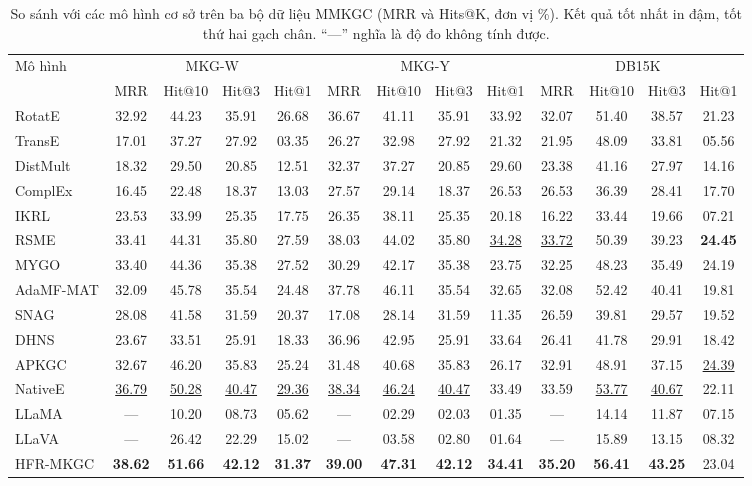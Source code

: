 \documentclass[10pt,twocolumn,a4paper]{article}
\begin{document}
\begin{table}[t]
\centering
\small
\setlength{\tabcolsep}{4.5pt}
\begin{tabular}{l cccc cccc cccc}
\toprule
\multirow{2}{*}{Mô hình} & \multicolumn{4}{c}{MKG-W} & \multicolumn{4}{c}{MKG-Y} & \multicolumn{4}{c}{DB15K}\\
\cmidrule(lr){2-5}\cmidrule(lr){6-9}\cmidrule(lr){10-13}
 & MRR & Hit@10 & Hit@3 & Hit@1 & MRR & Hit@10 & Hit@3 & Hit@1 & MRR & Hit@10 & Hit@3 & Hit@1\\
\midrule
RotatE & 32.92 & 44.23 & 35.91 & 26.68 & 36.67 & 41.11 & 35.91 & 33.92 & 32.07 & 51.40 & 38.57 & 21.23 \\
TransE & 17.01 & 37.27 & 27.92 & 03.35 & 26.27 & 32.98 & 27.92 & 21.32 & 21.95 & 48.09 & 33.81 & 05.56 \\
DistMult & 18.32 & 29.50 & 20.85 & 12.51 & 32.37 & 37.27 & 20.85 & 29.60 & 23.38 & 41.16 & 27.97 & 14.16 \\
ComplEx & 16.45 & 22.48 & 18.37 & 13.03 & 27.57 & 29.14 & 18.37 & 26.53 & 26.53 & 36.39 & 28.41 & 17.70 \\
IKRL & 23.53 & 33.99 & 25.35 & 17.75 & 26.35 & 38.11 & 25.35 & 20.18 & 16.22 & 33.44 & 19.66 & 07.21 \\
RSME & 33.41 & 44.31 & 35.80 & 27.59 & 38.03 & 44.02 & 35.80 & \underline{34.28} & \underline{33.72} & 50.39 & 39.23 & \textbf{24.45} \\
MYGO & 33.40 & 44.36 & 35.38 & 27.52 & 30.29 & 42.17 & 35.38 & 23.75 & 32.25 & 48.23 & 35.49 & 24.19 \\
AdaMF-MAT & 32.09 & 45.78 & 35.54 & 24.48 & 37.78 & 46.11 & 35.54 & 32.65 & 32.08 & 52.42 & 40.41 & 19.81 \\
SNAG & 28.08 & 41.58 & 31.59 & 20.37 & 17.08 & 28.14 & 31.59 & 11.35 & 26.59 & 39.81 & 29.57 & 19.52 \\
DHNS & 23.67 & 33.51 & 25.91 & 18.33 & 36.96 & 42.95 & 25.91 & 33.64 & 26.41 & 41.78 & 29.91 & 18.42 \\
APKGC & 32.67 & 46.20 & 35.83 & 25.24 & 31.48 & 40.68 & 35.83 & 26.17 & 32.91 & 48.91 & 37.15 & \underline{24.39} \\
NativeE & \underline{36.79} & \underline{50.28} & \underline{40.47} & \underline{29.36} & \underline{38.34} & \underline{46.24} & \underline{40.47} & 33.49 & 33.59 & \underline{53.77} & \underline{40.67} & 22.11 \\
LLaMA & --- & 10.20 & 08.73 & 05.62 & --- & 02.29 & 02.03 & 01.35 & --- & 14.14 & 11.87 & 07.15 \\
LLaVA & --- & 26.42 & 22.29 & 15.02 & --- & 03.58 & 02.80 & 01.64 & --- & 15.89 & 13.15 & 08.32 \\
\midrule
HFR-MKGC & \textbf{38.62} & \textbf{51.66} & \textbf{42.12} & \textbf{31.37} & \textbf{39.00} & \textbf{47.31} & \textbf{42.12} & \textbf{34.41} & \textbf{35.20} & \textbf{56.41} & \textbf{43.25} & 23.04 \\
\bottomrule
\end{tabular}
\caption{So sánh với các mô hình cơ sở trên ba bộ dữ liệu MMKGC (MRR và Hits@K, đơn vị \%). Kết quả tốt nhất in đậm, tốt thứ hai gạch chân. ``---'' nghĩa là độ đo không tính được.}
\label{tab:main}
\end{table}
\end{document}

